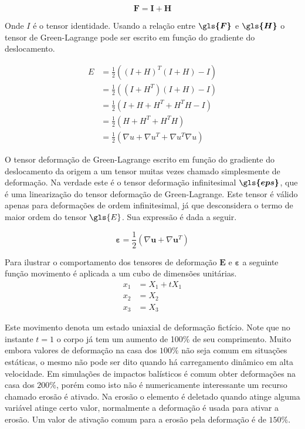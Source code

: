 \begin{equation}
    \boldsymbol{F} = \boldsymbol{I + H}
\end{equation}

Onde $ I $ é o tensor identidade.
Usando a relação entre $\boldsymbol{\gls{F}} $ e $ \boldsymbol{\gls{H}} $ o tensor de Green-Lagrange pode ser escrito em função do gradiente do deslocamento. 

 \boldmath\begin{align}
    E &= \frac{1}{2}((I + H)^T(I+H) - I)\\
    &=\frac{1}{2}((I + H^T)(I+H)-I) \\
    &= \frac{1}{2}(I + H + H^T + H^TH - I )\\
    &= \frac{1}{2}(H + H^T + H^TH) \\
    &= \frac{1}{2}(\nabla u + \nabla u^T + \nabla u^T\nabla u)
    \label{eq:green_lag_desl}
\end{align} \unboldmath

O tensor deformação de Green-Lagrange escrito em função do gradiente do deslocamento da origem a um tensor muitas vezes chamado simplesmente de deformação. Na verdade este é o tensor deformação infinitesimal $ \boldsymbol{\gls{eps}} $, que é uma linearização do tensor deformação de Green-Lagrange. Este tensor é válido apenas para deformações de ordem infinitesimal, já que desconsidera o termo de maior ordem do tensor $ \gls{E} $. Sua expressão é dada a seguir.

\begin{equation} \label{eq:definfi}
    \boldsymbol{\varepsilon} = \frac{1}{2}(\nabla \boldsymbol{u} + \nabla \boldsymbol{u}^T)
\end{equation}

Para ilustrar o comportamento dos tensores de deformação $\boldsymbol{E}$ e $\boldsymbol{\varepsilon}$ a seguinte função movimento é aplicada a um cubo de dimensões unitárias. 
\begin{align}
	x_1 &= X_1 + tX_1 \\
	x_2 &= X_2 \\
	x_3 &= X_3 
\end{align}

Este movimento denota um estado uniaxial de deformação fictício. Note que no instante $t=1$ o corpo já tem um aumento de 100\% de seu comprimento. Muito embora valores de deformação na casa dos $100\%$ não seja comum em situações estáticas, o mesmo não pode ser dito quando há carregamento dinâmico em alta velocidade. Em simulações de impactos balísticos é comum obter deformações na casa dos $ 200\% $, porém como isto não é numericamente interessante um recurso chamado erosão é ativado. Na erosão o elemento é deletado quando atinge alguma variável atinge certo valor, normalmente a deformação é usada para ativar a erosão. Um valor de ativação comum para a erosão pela deformação é de $150\%$. \par

